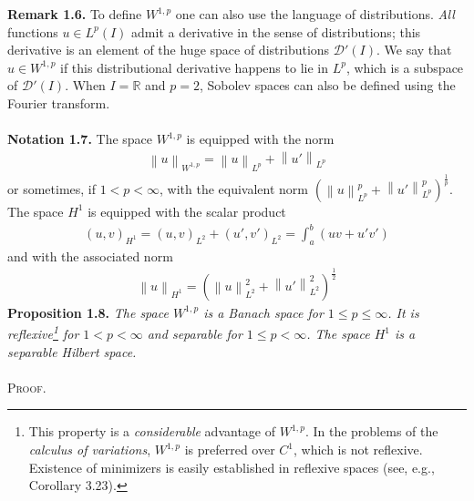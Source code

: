 \documentclass[a4paper,oneside]{article}
\numberwithin{equation}{section}
\begin{document}
\textbf{Remark 1.6.} To define $W^{1,p}$ one can also use the language of distributions. \textit{All} functions $u \in {L^p}\left( I \right)$ admit a derivative in the sense of distributions; this derivative is an element of the huge space of distributions $\mathcal{D}'\left(I\right)$. We say that $u \in {W^{1,p}}$ if this distributional derivative happens to lie in $L^p$, which is a subspace of $\mathcal{D}'\left(I\right)$. When $I=\mathbb{R}$ and $p=2$, Sobolev spaces can also be defined using the Fourier transform.\\
\\
\textbf{Notation 1.7.} The space $W^{1,p}$ is equipped with the norm
\begin{align}
{\left\| u \right\|_{{W^{1,p}}}} = {\left\| u \right\|_{{L^p}}} + {\left\| {u'} \right\|_{{L^p}}}
\end{align}
or sometimes, if $1<p<\infty$, with the equivalent norm ${\left( {\left\| u \right\|_{{L^p}}^p + \left\| {u'} \right\|_{{L^p}}^p} \right)^{\frac{1}{p}}}$. The space $H^1$ is equipped with the scalar product
\begin{align}
{\left( {u,v} \right)_{{H^1}}} = {\left( {u,v} \right)_{{L^2}}} + {\left( {u',v'} \right)_{{L^2}}} = \int_a^b {\left( {uv + u'v'} \right)} 
\end{align}
and with the associated norm
\begin{align}
{\left\| u \right\|_{{H^1}}} = {\left( {\left\| u \right\|_{{L^2}}^2 + \left\| {u'} \right\|_{{L^2}}^2} \right)^{\frac{1}{2}}}
\end{align}
\textbf{Proposition 1.8.} \textit{The space $W^{1,p}$ is a Banach space for $1\le p\le \infty$. It is reflexive\footnote{This property is a \textit{considerable} advantage of $W^{1,p}$. In the problems of the \textit{calculus of variations}, $W^{1,p}$ is preferred over $C^1$, which is not reflexive. Existence of minimizers is easily established in reflexive spaces (see, e.g., Corollary 3.23).} for $1<p<\infty$ and separable for $1\le p <\infty$. The space $H^1$ is a separable Hilbert space.}\\
\\
\textsc{Proof.} 
\end{document}
